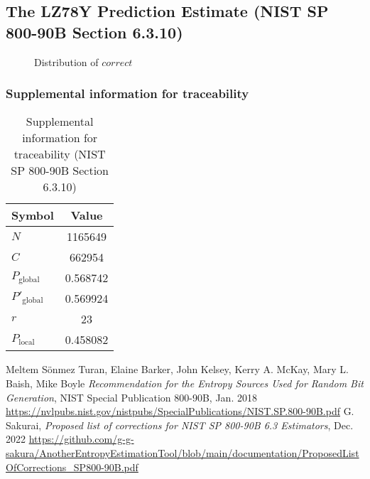 \documentclass[a3paper,xelatex,english]{bxjsarticle}
\begin{document}
\subsection{The LZ78Y Prediction Estimate (NIST SP 800-90B Section 6.3.10)}
\begin{figure}[htbp]
\centering

\caption{Distribution of $correct$}
\end{figure}
\subsubsection{Supplemental information for traceability}
\renewcommand{\arraystretch}{1.8}
\begin{table}[h]
\caption{Supplemental information for traceability (NIST SP 800-90B Section 6.3.10)}
\begin{center}
\begin{tabular}{|l|c|}
\hline 
\rowcolor{anotherlightblue} %
Symbol				& Value \\ \hline 
$N$				& 1165649\\ \hline 
$C$				& 662954\\ \hline 
$P_{\textrm{global}}$				& 0.568742\\ \hline 
$P'_{\textrm{global}}$			& 0.569924\\ \hline 
$r$				& 23\\ \hline 
$P_{\textrm{local}}$ 			& 0.458082\\ \hline
\end{tabular}
\end{center}
\end{table}
\renewcommand{\arraystretch}{1.4}
\begin{thebibliography}{99}
Meltem S\"{o}nmez Turan,
Elaine Barker,
John Kelsey,
Kerry A. McKay,
Mary L. Baish,
Mike Boyle
\textit{Recommendation for the Entropy Sources Used for Random Bit Generation},
NIST Special Publication 800-90B, Jan. 2018 
\url{https://nvlpubs.nist.gov/nistpubs/SpecialPublications/NIST.SP.800-90B.pdf}
G. Sakurai, \textit{Proposed list of corrections for NIST SP 800-90B 6.3 Estimators}, Dec. 2022 
\url{https://github.com/g-g-sakura/AnotherEntropyEstimationTool/blob/main/documentation/ProposedListOfCorrections_SP800-90B.pdf}
\end{thebibliography}
\end{document}
